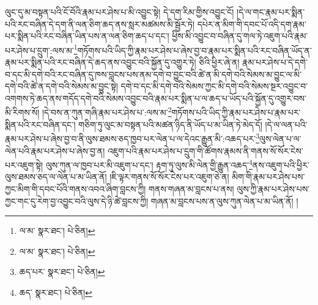 ལུང་དུ་མ་བསྟན་པའི་ངོ་བོའི་རྣམ་པར་ཤེས་པ་མི་འབྱུང་སྟེ། དེ་དག་རིམ་གྱིས་འབྱུང་ངོ། །དེ་ལ་གང་རྣམ་པར་སྨིན་པའི་རང་བཞིན་དེ་དག་ནི་ལན་ཅིག་ཆད་ནས་སླར་མཚམས་མི་སྦྱོར་ཏེ། དཔེར་ན་མིག་གི་དབང་པོ་འདི་དག་རྣམ་པར་སྨིན་པའི་རང་བཞིན་ཡིན་པས་ན་ལན་ཅིག་ཆད་པ་དང་། ཕྱིས་མི་འབྱུང་བ་བཞིན་དུ་གལ་ཏེ་འཇུག་པའི་རྣམ་པར་ཤེས་པ་དྲུག་:ལས་མ་\footnote{ལ་མ་  སྣར་ཐང་།  པེ་ཅིན། }གཏོགས་པའི་ཡིད་ཀྱི་རྣམ་པར་ཤེས་པ་ཞེས་བྱ་བ་རྣམ་པར་སྨིན་པའི་རང་བཞིན་ཡོད་ན་རྣམ་པར་སྨིན་པའི་རང་བཞིན་དེ་ཆད་ནས་འབྱུང་བའི་སྐྱོན་དུ་འགྱུར་ཏེ། ཅིའི་ཕྱིར་ཞེ་ན། རྣམ་པར་ཤེས་པ་དེ་དགེ་བ་དང་མི་དགེ་བའི་རང་བཞིན་དུ་ཁས་བླངས་པས་ནམ་དགེ་བ་བྱུང་བའི་ཚེ་ན་མི་དགེ་བའི་སེམས་མ་བྱུང་ལ་མི་དགེ་བའི་ཚེ་ན་དགེ་བའི་སེམས་མ་བྱུང་སྟེ། དགེ་བ་དང་མི་དགེ་བའི་སེམས་ཀྱང་མི་དགེ་བའི་སེམས་སྔར་འབྱུང་བ་འགགས་ཏེ་ཆད་ནས་གདོད་དགེ་བའི་སེམས་འབྱུང་བའི་རྣམ་པར་སྨིན་པ་ལ་ཆད་པ་ཡོད་པའི་སྐྱོན་དུ་འགྱུར་བས་མི་རིགས་སོ། །དེ་བས་ན་ཀུན་གཞི་རྣམ་པར་ཤེས་པ་:ལས་མ་\footnote{ལ་མ་  སྣར་ཐང་།  པེ་ཅིན། }གཏོགས་པའི་ཡིད་ཀྱི་རྣམ་པར་ཤེས་པ་རྣམ་པར་སྨིན་པའི་རང་བཞིན་དང་། གཅིག་ཏུ་ལུང་མ་བསྟན་པའི་མཚན་ཉིད་ནི་ཡོད་པ་མ་ཡིན་ཏེ་མེད་དོ། །དེ་ལ་ལན་པའི་རྣམ་པར་ཤེས་པ་ཞེས་བྱ་བ་ནི་ལུས་ཐམས་ཅད་ཁྱབ་པར་ལེན་པ་ལ་དེའང་རྒྱུན་མི་:འཆད་པར་\footnote{ཆད་པར་  སྣར་ཐང་།  པེ་ཅིན། }ལུས་ལེན་པ་ལ་ལེན་པའི་རྣམ་པར་ཤེས་པ་ཞེས་བྱ་ན། འཇུག་པའི་རྣམ་པར་ཤེས་པ་དྲུག་གི་ཚོགས་རྣམས་ནི་གནས་སོ་སོར་ངེས་པར་འཇུག་སྟེ། ལུས་ཀུན་ལ་ཁྱབ་པར་མི་འཇུག་པ་དང་། རྟག་ཏུ་ལུས་མི་ལེན་གྱི་རྒྱུན་འཆད་\footnote{ཆད་  སྣར་ཐང་།  པེ་ཅིན། }ནས་འཇུག་པའི་ཕྱིར་ལུས་ཐམས་ཅད་ལ་ལེན་པ་མ་ཡིན་ནོ། །ཇི་ལྟར་གནས་སོ་སོར་ངེས་པར་འཇུག་ཅེ་ན། མིག་གི་རྣམ་པར་ཤེས་པས་ཀྱང་མིག་གི་དབང་པོའི་གནས་འབའ་ཞིག་བླངས་ཀྱི། གནས་གཞན་མ་བླངས་པ་ནས། ལུས་ཀྱི་རྣམ་པར་ཤེས་པས་ཀྱང་གང་དུ་རེག་བྱ་འབྱུང་བའི་ལུས་དེ་ཉི་ཚེ་བླངས་ཀྱི། གཞན་མ་བླངས་པས་ན་ལུས་ཀུན་ལེན་པ་མ་ཡིན་ནོ། །
